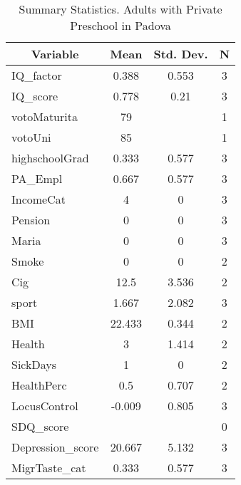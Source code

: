 
\begin{table}[htbp]\centering \caption{Summary Statistics. Adults with Private Preschool in Padova \label{bothAdultmaternaPrivPadova}}
\begin{tabular}{l c c  c}\hline\hline
\multicolumn{1}{c}{\textbf{Variable}} & \textbf{Mean}
 & \textbf{Std. Dev.} & \textbf{N}\\ \hline
IQ\_factor & 0.388 & 0.553  & 3\\
IQ\_score & 0.778 & 0.21  & 3\\
votoMaturita & 79 &   & 1\\
votoUni & 85 &   & 1\\
highschoolGrad & 0.333 & 0.577  & 3\\
PA\_Empl & 0.667 & 0.577  & 3\\
IncomeCat & 4 & 0  & 3\\
Pension & 0 & 0  & 3\\
Maria & 0 & 0  & 3\\
Smoke & 0 & 0  & 2\\
Cig & 12.5 & 3.536  & 2\\
sport & 1.667 & 2.082  & 3\\
BMI & 22.433 & 0.344  & 2\\
Health & 3 & 1.414  & 2\\
SickDays & 1 & 0  & 2\\
HealthPerc & 0.5 & 0.707  & 2\\
LocusControl & -0.009 & 0.805  & 3\\
SDQ\_score &  &   & 0\\
Depression\_score & 20.667 & 5.132  & 3\\
MigrTaste\_cat & 0.333 & 0.577  & 3\\
\hline\end{tabular}
\end{table}
